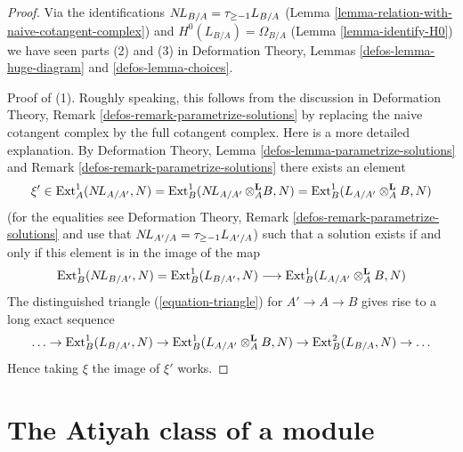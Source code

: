 \begin{proof}
Via the identifications $\mathop{N\!L}\nolimits_{B/A} = \tau_{\geq -1}L_{B/A}$
(Lemma \ref{lemma-relation-with-naive-cotangent-complex}) and
$H^0(L_{B/A}) = \Omega_{B/A}$ (Lemma \ref{lemma-identify-H0})
we have seen parts (2) and (3) in
Deformation Theory, Lemmas \ref{defos-lemma-huge-diagram} and
\ref{defos-lemma-choices}.

\medskip\noindent
Proof of (1). Roughly speaking, this follows from the discussion in 
Deformation Theory, Remark \ref{defos-remark-parametrize-solutions}
by replacing the naive cotangent complex by the full cotangent complex.
Here is a more detailed explanation. By
Deformation Theory, Lemma \ref{defos-lemma-parametrize-solutions}
and Remark \ref{defos-remark-parametrize-solutions}
there exists an element
$$
\xi' \in
\mathop{\mathrm{Ext}}\nolimits^1_A(\mathop{N\!L}\nolimits_{A/A'}, N) =
\mathop{\mathrm{Ext}}\nolimits^1_B(\mathop{N\!L}\nolimits_{A/A'} \otimes_A^\mathbf{L} B, N) =
\mathop{\mathrm{Ext}}\nolimits^1_B(L_{A/A'} \otimes_A^\mathbf{L} B, N)
$$
(for the equalities see Deformation Theory, Remark
\ref{defos-remark-parametrize-solutions} and use that
$\mathop{N\!L}\nolimits_{A'/A} = \tau_{\geq -1} L_{A'/A}$)
such that a solution exists if and only if this element is in
the image of the map
$$
\mathop{\mathrm{Ext}}\nolimits^1_B(\mathop{N\!L}\nolimits_{B/A'}, N) = \mathop{\mathrm{Ext}}\nolimits^1_B(L_{B/A'}, N)
\longrightarrow
\mathop{\mathrm{Ext}}\nolimits^1_B(L_{A/A'} \otimes_A^\mathbf{L} B, N)
$$
The distinguished triangle (\ref{equation-triangle})
for $A' \to A \to B$ gives rise to a long exact sequence
$$
\ldots \to
\mathop{\mathrm{Ext}}\nolimits^1_B(L_{B/A'}, N) \to
\mathop{\mathrm{Ext}}\nolimits^1_B(L_{A/A'} \otimes_A^\mathbf{L} B, N) \to
\mathop{\mathrm{Ext}}\nolimits^2_B(L_{B/A}, N) \to \ldots
$$
Hence taking $\xi$ the image of $\xi'$ works.
\end{proof}





\section{The Atiyah class of a module}
\label{section-atiyah}


